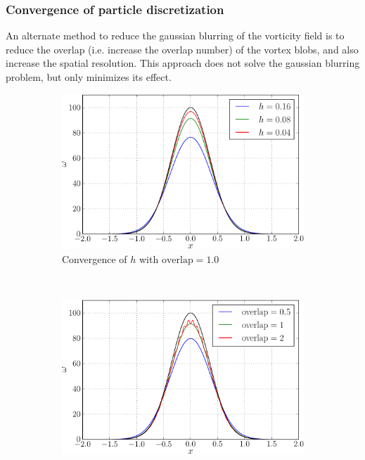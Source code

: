 \subsubsection{Convergence of particle discretization}

An alternate method to reduce the gaussian blurring of the vorticity field is to reduce the overlap (i.e. increase the overlap number) of the vortex blobs, and also increase the spatial resolution. This approach does not solve the gaussian blurring problem, but only minimizes its effect.
	
\begin{figure}[t]
        \centering
        \begin{subfigure}[b]{0.5\textwidth}
                \includegraphics[width=\textwidth]{figures/lagrangian/betterInitialization_h-crop.pdf}
                \caption{Convergence of $h$ with $\mathrm{overlap} = 1.0$}
                \label{fig:convergenceOfBlobsH}
        \end{subfigure}%
        ~ %
        \begin{subfigure}[b]{0.5\textwidth}
                \includegraphics[width=\textwidth]{figures/lagrangian/betterInitialization_overlap-crop.pdf}

\end{subfigure}
\end{figure}
